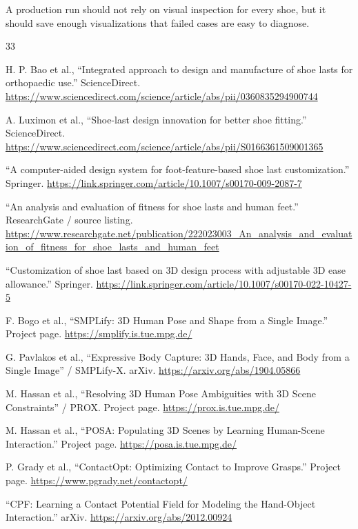 \documentclass[11pt]{article}
\begin{document}
A production run should not rely on visual inspection for every shoe, but it should save enough visualizations that failed cases are easy to diagnose.

\begin{thebibliography}{33}

H. P. Bao et al.,
``Integrated approach to design and manufacture of shoe lasts for orthopaedic use.''
ScienceDirect.
\url{https://www.sciencedirect.com/science/article/abs/pii/0360835294900744}

A. Luximon et al.,
``Shoe-last design innovation for better shoe fitting.''
ScienceDirect.
\url{https://www.sciencedirect.com/science/article/abs/pii/S0166361509001365}

``A computer-aided design system for foot-feature-based shoe last customization.''
Springer.
\url{https://link.springer.com/article/10.1007/s00170-009-2087-7}

``An analysis and evaluation of fitness for shoe lasts and human feet.''
ResearchGate / source listing.
\url{https://www.researchgate.net/publication/222023003_An_analysis_and_evaluation_of_fitness_for_shoe_lasts_and_human_feet}

``Customization of shoe last based on 3D design process with adjustable 3D ease allowance.''
Springer.
\url{https://link.springer.com/article/10.1007/s00170-022-10427-5}

F. Bogo et al.,
``SMPLify: 3D Human Pose and Shape from a Single Image.''
Project page.
\url{https://smplify.is.tue.mpg.de/}

G. Pavlakos et al.,
``Expressive Body Capture: 3D Hands, Face, and Body from a Single Image'' / SMPLify-X.
arXiv.
\url{https://arxiv.org/abs/1904.05866}

M. Hassan et al.,
``Resolving 3D Human Pose Ambiguities with 3D Scene Constraints'' / PROX.
Project page.
\url{https://prox.is.tue.mpg.de/}

M. Hassan et al.,
``POSA: Populating 3D Scenes by Learning Human-Scene Interaction.''
Project page.
\url{https://posa.is.tue.mpg.de/}

P. Grady et al.,
``ContactOpt: Optimizing Contact to Improve Grasps.''
Project page.
\url{https://www.pgrady.net/contactopt/}

``CPF: Learning a Contact Potential Field for Modeling the Hand-Object Interaction.''
arXiv.
\url{https://arxiv.org/abs/2012.00924}


\end{thebibliography}
\end{document}
